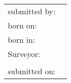 {\begin{titlepage}
		\vfill
{}
		{\large \raggedleft
			\begin{tabularx}{\textwidth}{l@{\,\,\raggedright~}L} %
				submitted by: & \@titelAutor\\
				born on: & {\@titelGeburtsdatum}\\
				born in: & \@titelGeburtsort
				\vspace{0.5\baselineskip}\\
				Surveyor: & \@titelGutachterA \\
					& \@titelGutachterB
				\vspace{0.5\baselineskip}\\
				submitted on: & \@titelEinreichungsdatum \hfill \@titelVerteidigungsdatum
			\end{tabularx}}
			\vspace{-1\baselineskip}\\\phantom{x} %
		\setlength{\parindent}{\parindentbak}
		\setlength{\parskip}{\parskipbak}
	\end{titlepage}

	\let\@titelTitel\undefined
	\let\titel\undefined
	\let\@titelArbeit\undefined
	\let\typ\undefined
	\let\@titelGrad\undefined
	\let\grad\undefined
	\let\@titelAutor\undefined
	\let\autor\undefined
	\let\@titelGeburtsdatum\undefined
	\let\gebdatum\undefined
	\let\@titelGeburtsort\undefined
	\let\gebort\undefined
	\let\@titelGutachterA\undefined
	\let\@titelGutachterB\undefined
	\let\gutachter\undefined
	\let\@titelEinreichungsdatum\undefined
	\let\einreichungsdatum\undefined
	\let\@titelVerteidigungsdatum\undefined
	\let\verteidigungsdatum\undefined

	\KOMAoptions{\@wastwoside}%
	\let\@wastwoside\undefined
	\cleardoublepage %
}

